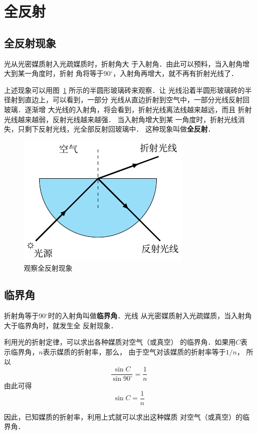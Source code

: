 \section{全反射}
\subsection{全反射现象}

光从光密媒质射入光疏媒质时，折射角大
于入射角．由此可以预料，当入射角增大到某一角度时，折射
角将等于90$^\circ$，入射角再增大，就不再有折射光线了．


上述现象可以用图~\ref{fig_C_5-23} 所示的半圆形玻璃砖来观察．让
光线沿着半圆形玻璃砖的半径射到直边上，可以看到，一部分
光线从直边折射到空气中，一部分光线反射回玻璃．逐渐增
大光线的入射角，将会看到，折射光线离法线越来越远，而且
折射光线越来越弱，反射光线越来越强．
当入射角增大到某
一角度时，折射光线消失，只剩下反射光线，光全部反射回玻璃中．
这种现象叫做\textbf{全反射}．
\begin{figure}[htbp]
	\centering
	\includegraphics{fig/C/5-23.pdf}
	\caption{观察全反射现象}\label{fig_C_5-23}
\end{figure}

\subsection{临界角}

折射角等于90$^\circ$时的入射角叫做\textbf{临界角}．光线
从光密媒质射入光疏媒质，当入射角大于临界角时，就发生全
反射现象．

利用光的折射定律，可以求出各种媒质对空气（或真空）
的临界角．如果用$C$表示临界角，$n$表示媒质的折射率，那么，
由于空气对该媒质的折射率等于$1/n$，
所以
\[\frac{\sin C}{\sin 90^\circ}=\frac{1}{n} \]
由此可得
\[\sin C=\frac{1}{n} \]

因此，已知媒质的折射率，利用上式就可以求出这种媒质
对空气（或真空）的临界角．

